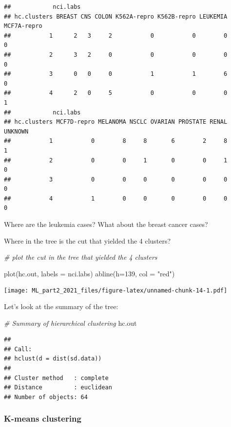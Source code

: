 \documentclass[
]{article}
\newenvironment{Shaded}{\begin{snugshade}}{\end{snugshade}}
\newcommand{\AttributeTok}[1]{\textcolor[rgb]{0.77,0.63,0.00}{#1}}
\newcommand{\CommentTok}[1]{\textcolor[rgb]{0.56,0.35,0.01}{\textit{#1}}}
\newcommand{\DecValTok}[1]{\textcolor[rgb]{0.00,0.00,0.81}{#1}}
\newcommand{\FunctionTok}[1]{\textcolor[rgb]{0.00,0.00,0.00}{#1}}
\newcommand{\NormalTok}[1]{#1}
\newcommand{\StringTok}[1]{\textcolor[rgb]{0.31,0.60,0.02}{#1}}
\begin{document}
\begin{verbatim}
##            nci.labs
## hc.clusters BREAST CNS COLON K562A-repro K562B-repro LEUKEMIA MCF7A-repro
##           1      2   3     2           0           0        0           0
##           2      3   2     0           0           0        0           0
##           3      0   0     0           1           1        6           0
##           4      2   0     5           0           0        0           1
##            nci.labs
## hc.clusters MCF7D-repro MELANOMA NSCLC OVARIAN PROSTATE RENAL UNKNOWN
##           1           0        8     8       6        2     8       1
##           2           0        0     1       0        0     1       0
##           3           0        0     0       0        0     0       0
##           4           1        0     0       0        0     0       0
\end{verbatim}

Where are the leukemia cases? What about the breast cancer cases?

Where in the tree is the cut that yielded the 4 clusters?

\begin{Shaded}
\begin{Highlighting}[]
\CommentTok{\# plot the cut in the tree that yielded the 4 clusters}

\FunctionTok{plot}\NormalTok{(hc.out, }\AttributeTok{labels =}\NormalTok{ nci.labs)}
\FunctionTok{abline}\NormalTok{(}\AttributeTok{h=}\DecValTok{139}\NormalTok{, }\AttributeTok{col =} \StringTok{"red"}\NormalTok{)}
\end{Highlighting}
\end{Shaded}

\texttt{[image: ML\_part2\_2021\_files/figure-latex/unnamed-chunk-14-1.pdf]}

Let's look at the summary of the tree:

\begin{Shaded}
\begin{Highlighting}[]
\CommentTok{\# Summary of hierarchical clustering}
\NormalTok{hc.out}
\end{Highlighting}
\end{Shaded}

\begin{verbatim}
## 
## Call:
## hclust(d = dist(sd.data))
## 
## Cluster method   : complete 
## Distance         : euclidean 
## Number of objects: 64
\end{verbatim}

\hypertarget{k-means-clustering}{%
\subsubsection{K-means clustering}\label{k-means-clustering}}
\end{document}
